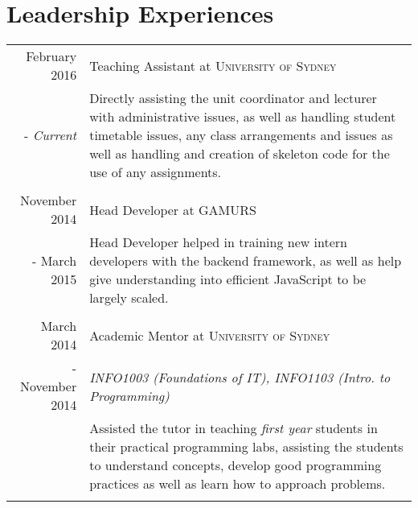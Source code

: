 \documentclass[10pt]{article}
\begin{document}
\section{Leadership Experiences} 
\begin{tabular}{r p{11cm}}
February 2016 & Teaching Assistant at \textsc{University of Sydney} \\ - \emph{Current} & \footnotesize{Directly assisting the unit coordinator and lecturer with administrative issues, as well as handling student timetable issues, any class arrangements and issues as well as handling and creation of skeleton code for the use of any assignments.}\\\multicolumn{2}{c}{} \\
November 2014 & Head Developer at \textsc{GAMURS} \\ - March 2015 & \footnotesize{Head Developer helped in training new intern developers with the backend framework, as well as help give understanding into efficient JavaScript to be largely scaled.}\\\multicolumn{2}{c}{} \\
March 2014 & Academic Mentor at \textsc{University of Sydney} \\  - November 2014 & \emph{INFO1003 (Foundations of IT), INFO1103 (Intro. to Programming)} \\ & \footnotesize{Assisted the tutor in teaching \emph{first year} students in their practical programming labs, assisting the students to understand concepts, develop good programming practices as well as learn how to approach problems.}\\\multicolumn{2}{c}{} \\
\end{tabular}


\end{document}
